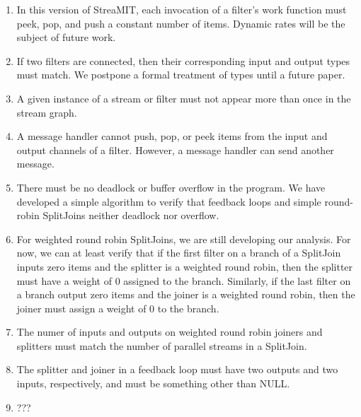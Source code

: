 \begin{enumerate}

\item In this version of StreaMIT, each invocation of a filter's work
function must peek, pop, and push a constant number of items.  Dynamic
rates will be the subject of future work.

\item If two filters are connected, then their corresponding input and
output types must match.  We postpone a formal treatment of types
until a future paper.

\item A given instance of a stream or filter must not appear more than
once in the stream graph.

\item A message handler cannot push, pop, or peek items from the input
and output channels of a filter.  However, a message handler can send
another message.

\item There must be no deadlock or buffer overflow in the program.  We
have developed a simple algorithm to verify that feedback loops and
simple round-robin SplitJoins neither deadlock nor overflow.

\item For weighted round robin SplitJoins, we are still developing our
analysis.  For now, we can at least verify that if the first filter on
a branch of a SplitJoin inputs zero items and the splitter is a
weighted round robin, then the splitter must have a weight of 0
assigned to the branch.  Similarly, if the last filter on a branch
output zero items and the joiner is a weighted round robin, then the
joiner must assign a weight of 0 to the branch.

\item The numer of inputs and outputs on weighted round robin joiners
and splitters must match the number of parallel streams in a
SplitJoin.

\item The splitter and joiner in a feedback loop must have two outputs
and two inputs, respectively, and must be something other than NULL.

\item ???

\end{enumerate}
